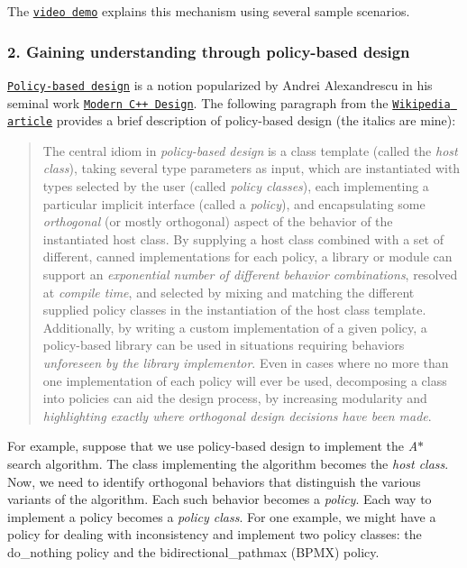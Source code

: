 The \href{https://youtu.be/cElxLWve1Zw}{\tt video demo} explains this mechanism using several sample scenarios.\hypertarget{index_s-policy}{}\subsubsection{2. Gaining understanding through policy-\/based design}\label{index_s-policy}
\href{https://en.wikipedia.org/wiki/Policy-based_design}{\tt Policy-\/based design} is a notion popularized by Andrei Alexandrescu in his seminal work \href{https://en.wikipedia.org/wiki/Modern_C%2B%2B_Design}{\tt Modern C++ Design}. The following paragraph from the \href{https://en.wikipedia.org/wiki/Policy-based_design}{\tt Wikipedia article} provides a brief description of policy-\/based design (the italics are mine)\+: \begin{quote}
The central idiom in {\itshape policy-\/based design} is a class template (called the {\itshape host class}), taking several type parameters as input, which are instantiated with types selected by the user (called {\itshape policy classes}), each implementing a particular implicit interface (called a {\itshape policy}), and encapsulating some {\itshape orthogonal} (or mostly orthogonal) aspect of the behavior of the instantiated host class. By supplying a host class combined with a set of different, canned implementations for each policy, a library or module can support an {\itshape exponential number of different behavior combinations}, resolved at {\itshape compile time}, and selected by mixing and matching the different supplied policy classes in the instantiation of the host class template. Additionally, by writing a custom implementation of a given policy, a policy-\/based library can be used in situations requiring behaviors {\itshape unforeseen by the library implementor}. Even in cases where no more than one implementation of each policy will ever be used, decomposing a class into policies can aid the design process, by increasing modularity and {\itshape highlighting exactly where orthogonal design decisions have been made}. \end{quote}
For example, suppose that we use policy-\/based design to implement the {\itshape A$\ast$} search algorithm. The class implementing the algorithm becomes the {\itshape host class}. Now, we need to identify orthogonal behaviors that distinguish the various variants of the algorithm. Each such behavior becomes a {\itshape policy}. Each way to implement a policy becomes a {\itshape policy class}. For one example, we might have a policy for dealing with inconsistency and implement two policy classes\+: the {\ttfamily do\+\_\+nothing} policy and the {\ttfamily bidirectional\+\_\+pathmax (B\+P\+MX)} policy.

